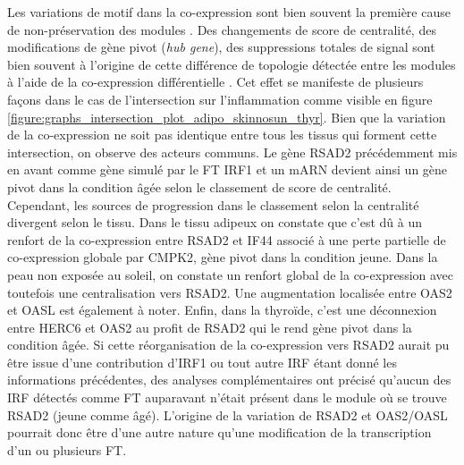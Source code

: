Les variations de motif dans la co-expression sont bien souvent la première cause de non-préservation des modules . Des changements de score de centralité, des modifications de gène pivot (\textit{hub gene}), des suppressions totales de signal sont bien souvent à l'origine de cette différence de topologie détectée entre les modules à l'aide de la co-expression différentielle . Cet effet se manifeste de plusieurs façons dans le cas de l'intersection sur l'inflammation comme visible en figure \ref{figure:graphs_intersection_plot_adipo_skinnosun_thyr}. Bien que la variation de la co-expression ne soit pas identique entre tous les tissus qui forment cette intersection, on observe des acteurs communs. Le gène RSAD2 précédemment mis en avant comme gène simulé par le FT IRF1 et un mARN devient ainsi un gène pivot dans la condition âgée selon le classement de score de centralité. Cependant, les sources de progression dans le classement selon la centralité divergent selon le tissu. Dans le tissu adipeux on constate que c'est dû à un renfort de la co-expression entre RSAD2 et IF44 associé à une perte partielle de co-expression globale par CMPK2, gène pivot dans la condition jeune. Dans la peau non exposée au soleil, on constate un renfort global de la co-expression avec toutefois une centralisation vers RSAD2. Une augmentation localisée entre OAS2 et OASL est également à noter. Enfin, dans la thyroïde, c'est une déconnexion entre HERC6 et OAS2 au profit de RSAD2 qui le rend gène pivot dans la condition âgée. Si cette réorganisation de la co-expression vers RSAD2 aurait pu être issue d'une contribution d'IRF1 ou tout autre IRF étant donné les informations précédentes, des analyses complémentaires ont précisé qu'aucun des IRF détectés comme FT auparavant n'était présent dans le module où se trouve RSAD2 (jeune comme âgé). L'origine de la variation de RSAD2 et OAS2/OASL pourrait donc être d'une autre nature qu'une modification de la transcription d'un ou plusieurs FT.

